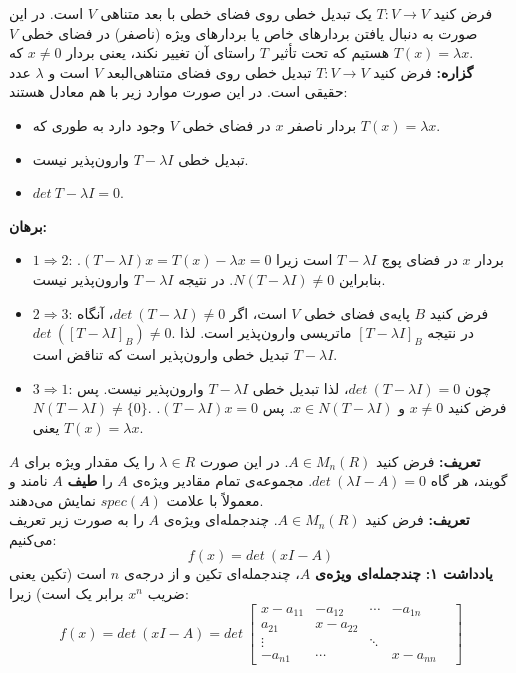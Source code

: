 

	فرض کنید $T: V\rightarrow V$ یک تبدیل خطی روی فضا‌ی خطی با بعد متناهی $V$ است. در این صورت به دنبال یافتن بردار‌های خاص یا بردار‌های ویژه (ناصفر) در فضا‌ی خطی $V$ هستیم که تحت تأثیر $T$ راستای آن تغییر نکند، یعنی بردار $x\neq 0$ که $T(x) = \lambda x$.\\
	\textbf{گزاره:} فرض کنید $T:V \rightarrow V$ تبدیل خطی روی فضا‌ی متناهی‌البعد $V$ است و $\lambda$ عدد حقیقی است. در این صورت موارد زیر با هم معادل هستند:
	\begin{itemize}
		\item بردار ناصفر $x$ در فضا‌ی خطی $V$ وجود دارد به طوری که $T(x) = \lambda x$.
		\item تبدیل خطی $T-\lambda I$ وارون‌پذیر نیست.
		\item $det\: T-\lambda I = 0$.
	\end{itemize}
	\textbf{برهان:} 
	\begin{itemize}
		\item $1 \Rightarrow 2$: بردار $x$ در فضا‌ی پوچ $T-\lambda I$ است زیرا $(T-\lambda I)x = T(x) - \lambda x = 0$. بنابراین $N(T-\lambda I) \neq 0$. در نتیجه $T-\lambda I$ وارون‌پذیر نیست.
		\item $2 \Rightarrow 3$: فرض کنید $B$ پایه‌ی فضا‌ی خطی $V$ است، اگر $det\:(T-\lambda I) \neq 0$، آنگاه \\${det\: ([T-\lambda I]_B) \neq 0}$. در نتیجه $[T-\lambda I]_B$ ماتریسی وارون‌پذیر است. لذا $T-\lambda I$ تبدیل خطی وارون‌پذیر است که تناقض است.
		\item $3\Rightarrow 1$: چون $det\: (T- \lambda I) = 0$، لذا تبدیل خطی $T-\lambda I$ وارون‌پذیر نیست. پس \\$N(T-\lambda I)\neq \{0\}$. فرض کنید $x \neq 0$ و $x \in N(T - \lambda I)$. پس $(T-\lambda I)x = 0$. یعنی $T(x) = \lambda x$.
	\end{itemize}
	\textbf{تعریف:} فرض کنید $A \in M_n(R)$. در این صورت $\lambda \in R$ را یک مقدار ویژه برای $A$ گویند، هر گاه $det\: (\lambda I - A) = 0$. مجموعه‌ی تمام مقادیر ویژه‌ی $A$ را \textbf{طیف} $A$ نامند و معمولاً با علامت $spec(A)$ نمایش می‌دهند.\\
	\textbf{تعریف:} فرض کنید $A\in M_n(R)$. چند‌جمله‌ای ویژه‌ی $A$ را به صورت زیر تعریف می‌کنیم:
	$$f(x) = det\: (xI - A)$$
	\textbf{یادداشت ۱:} \textbf{چند‌جمله‌ای ویژه‌ی} $A$، چند‌جمله‌ای تکین و از درجه‌ی $n$ است (تکین یعنی ضریب $x^n$ برابر یک است) زیرا:
	$$f(x) = det\:(xI - A) = det \: \begin{bmatrix}
	x-a_{11} & -a_{12} & \cdots & -a_{1n}\\
	a_{21} & x-a_{22} &&&\\
	\vdots && \ddots\\
	-a_{n1} & \cdots & & x- a_{nn}
	\end{bmatrix}$$
